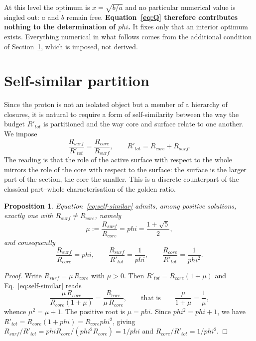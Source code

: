 \documentclass[11pt,a4paper]{article}
\def\varphi{phi}%
\def\mathrm#1{#1}%
\theoremstyle{definition}
\theoremstyle{plain}
\newtheorem{proposition}{Proposition}
\theoremstyle{remark}
\newcommand{\Rcore}{R_{\mathrm{core}}}
\newcommand{\Rsurf}{R_{\mathrm{surf}}}
\begin{document}
At this level the optimum is $x = \sqrt{b/a}$ and no particular numerical value is singled out: $a$ and $b$ remain free. \textbf{Equation~\eqref{eq:Q} therefore contributes nothing to the determination of $\varphi$.} It fixes only that an interior optimum exists. Everything numerical in what follows comes from the additional condition of Section~\ref{sec:selfsim}, which is imposed, not derived.

\section{Self-similar partition}
\label{sec:selfsim}

Since the proton is not an isolated object but a member of a hierarchy of closures, it is natural to require a form of self-similarity between the way the budget $R'_{\mathrm{tot}}$ is partitioned and the way core and surface relate to one another. We impose
\begin{equation}
\frac{\Rsurf}{R'_{\mathrm{tot}}} = \frac{\Rcore}{\Rsurf},
\qquad R'_{\mathrm{tot}} = \Rcore + \Rsurf .
\label{eq:self-similar}
\end{equation}
The reading is that the role of the active surface with respect to the whole mirrors the role of the core with respect to the surface: the surface is the larger part of the section, the core the smaller. This is a discrete counterpart of the classical part--whole characterisation of the golden ratio.

\begin{proposition}
\label{prop:phi}
Equation~\eqref{eq:self-similar} admits, among positive solutions, exactly one with $\Rsurf \neq \Rcore$, namely
\[
\mu := \frac{\Rsurf}{\Rcore} = \varphi = \frac{1+\sqrt 5}{2},
\]
and consequently
\[
\frac{\Rsurf}{\Rcore} = \varphi, \qquad
\frac{\Rsurf}{R'_{\mathrm{tot}}} = \frac{1}{\varphi}, \qquad
\frac{\Rcore}{R'_{\mathrm{tot}}} = \frac{1}{\varphi^{2}} .
\]
\end{proposition}

\begin{proof}
Write $\Rsurf = \mu\,\Rcore$ with $\mu > 0$. Then $R'_{\mathrm{tot}} = \Rcore(1+\mu)$ and Eq.~\eqref{eq:self-similar} reads
\[
\frac{\mu\,\Rcore}{\Rcore(1+\mu)} = \frac{\Rcore}{\mu\,\Rcore},
\qquad\text{that is}\qquad
\frac{\mu}{1+\mu} = \frac{1}{\mu},
\]
whence $\mu^2 = \mu + 1$. The positive root is $\mu = \varphi$. Since $\varphi^2 = \varphi + 1$, we have $R'_{\mathrm{tot}} = \Rcore(1+\varphi) = \Rcore\varphi^2$, giving $\Rsurf/R'_{\mathrm{tot}} = \varphi\Rcore/(\varphi^2\Rcore) = 1/\varphi$ and $\Rcore/R'_{\mathrm{tot}} = 1/\varphi^2$.
\end{proof}
\end{document}
